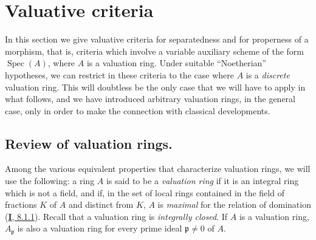 \section{Valuative criteria}
\label{section:II.7}

In this section we give valuative criteria for separatedness and for
properness of a morphism, that is, criteria which involve a variable auxiliary
scheme of the form $\operatorname{Spec}(A)$, where $A$ is
a valuation ring. Under suitable ``Noetherian'' hypotheses, we can
restrict in these criteria to the case where $A$ is a \emph{discrete}
valuation ring. This will doubtless be the only case that we will
have to apply in what follows, and we have introduced arbitrary valuation
rings, in the general case, only in order to make the connection with
classical developments.

\subsection{Review of valuation rings.}
\label{subsection:II.7.1}

\begin{env}[7.1.1]
\label{II.7.1.1}
Among the various equivalent properties that characterize valuation
rings, we will use the following: a ring $A$ is said to be a
\emph{valuation ring} if it is an integral ring which is not a
field, and if, in the set of local rings contained in the field of
fractions $K$ of $A$ and distinct from $K$, $A$ is \emph{maximal} for the
relation of domination (\hyperref[I.8.1.1]{\textbf{I}, 8.1.1}). Recall that a
valuation ring is \emph{integrally closed}. If $A$ is a valuation ring,
$A_{\mathfrak{p}}$ is also a valuation ring for every prime ideal
$\mathfrak{p}\neq0$ of $A$.
\end{env}

